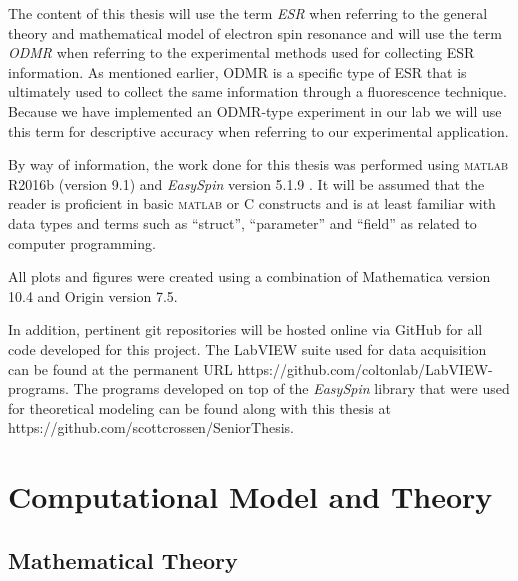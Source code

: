 \documentclass[oneside]{BYUPhys}
\begin{document}
The content of this thesis will use the term \textit{ESR} when referring to the general theory and mathematical model of electron spin resonance and will use the term \textit{ODMR} when referring to the experimental methods used for collecting ESR information. As mentioned earlier, ODMR is a specific type of ESR that is ultimately used to collect the same information through a fluorescence technique. Because we have implemented an ODMR-type experiment in our lab we will use this term for descriptive accuracy when referring to our experimental application.

By way of information, the work done for this thesis was performed using \textsc{matlab} R2016b (version 9.1) and \textit{EasySpin} version 5.1.9 . It will be assumed that the reader is proficient in basic \textsc{matlab} or C constructs and is at least familiar with data types and terms such as ``struct'', ``parameter'' and ``field'' as related to computer programming.

All plots and figures were created using a combination of Mathematica version 10.4 and Origin version 7.5.

In addition, pertinent git repositories will be hosted online via GitHub for all code developed for this project. The LabVIEW suite used for data acquisition can be found at the permanent URL https://github.com/coltonlab/LabVIEW-programs. The programs developed on top of the \textit{EasySpin} library that were used for theoretical modeling can be found along with this thesis at https://github.com/scottcrossen/SeniorThesis.










\chapter{Computational Model and Theory}

\section{Mathematical Theory}
\end{document}
